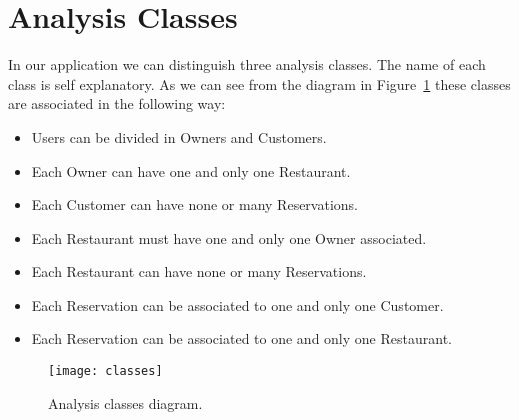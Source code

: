 \section{Analysis Classes}

In our application we can distinguish three analysis classes. The name of each
class is self explanatory. As we can see from the diagram in
Figure~\ref{fig:classes} these classes are associated in the following way:

\begin{itemize}
	\item Users can be divided in Owners and Customers.
	\item Each Owner can have one and only one Restaurant.
	\item Each Customer can have none or many Reservations.
	\item Each Restaurant must have one and only one Owner associated.
	\item Each Restaurant can have none or many Reservations.
	\item Each Reservation can be associated to one and only one Customer.
	\item Each Reservation can be associated to one and only one Restaurant.
\end{itemize}

\begin{figure}[ht]
	\texttt{[image: classes]}
	\caption{Analysis classes diagram.}
	\label{fig:classes}
\end{figure}

